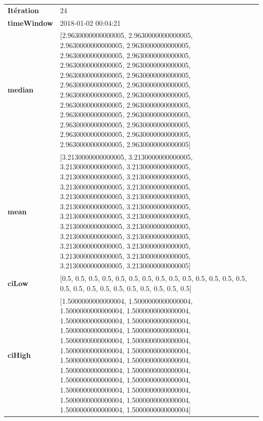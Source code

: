\begin{table}[H]
	\centering
	\begin{tabularx}{\textwidth}{lX}
		\textbf{Itération}& 24\\
		\textbf{timeWindow} & 2018-01-02 00:04:21 \\
		\textbf{median}& [2.9630000000000005, 2.9630000000000005, 2.9630000000000005, 2.9630000000000005, 2.9630000000000005, 2.9630000000000005, 2.9630000000000005, 2.9630000000000005, 2.9630000000000005, 2.9630000000000005, 2.9630000000000005, 2.9630000000000005, 2.9630000000000005, 2.9630000000000005, 2.9630000000000005, 2.9630000000000005, 2.9630000000000005, 2.9630000000000005, 2.9630000000000005, 2.9630000000000005, 2.9630000000000005, 2.9630000000000005, 2.9630000000000005, 2.9630000000000005] \\
		\textbf{mean} & [3.2130000000000005, 3.2130000000000005, 3.2130000000000005, 3.2130000000000005, 3.2130000000000005, 3.2130000000000005, 3.2130000000000005, 3.2130000000000005, 3.2130000000000005, 3.2130000000000005, 3.2130000000000005, 3.2130000000000005, 3.2130000000000005, 3.2130000000000005, 3.2130000000000005, 3.2130000000000005, 3.2130000000000005, 3.2130000000000005, 3.2130000000000005, 3.2130000000000005, 3.2130000000000005, 3.2130000000000005, 3.2130000000000005, 3.2130000000000005] \\
		\textbf{ciLow}& [0.5, 0.5, 0.5, 0.5, 0.5, 0.5, 0.5, 0.5, 0.5, 0.5, 0.5, 0.5, 0.5, 0.5, 0.5, 0.5, 0.5, 0.5, 0.5, 0.5, 0.5, 0.5, 0.5, 0.5] \\
		\textbf{ciHigh}& [1.5000000000000004, 1.5000000000000004, 1.5000000000000004, 1.5000000000000004, 1.5000000000000004, 1.5000000000000004, 1.5000000000000004, 1.5000000000000004, 1.5000000000000004, 1.5000000000000004, 1.5000000000000004, 1.5000000000000004, 1.5000000000000004, 1.5000000000000004, 1.5000000000000004, 1.5000000000000004, 1.5000000000000004, 1.5000000000000004, 1.5000000000000004, 1.5000000000000004, 1.5000000000000004, 1.5000000000000004, 1.5000000000000004, 1.5000000000000004] \\
			\end{tabularx} 
		\end{table}
		
